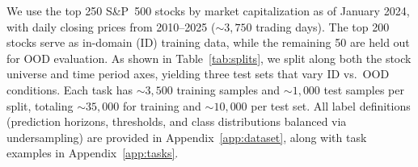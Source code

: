 We use the top 250 S\&P~500 stocks by market capitalization as of January 2024, with daily closing prices from 2010--2025 (${\sim}3{,}750$ trading days).
The top 200 stocks serve as in-domain (ID) training data, while the remaining 50 are held out for OOD evaluation.
As shown in Table~\ref{tab:splits}, we split along both the stock universe and time period axes, yielding three test sets that 
vary ID vs.\ OOD conditions.
Each task has ${\sim}3{,}500$ training samples
and ${\sim}1{,}000$ test samples per split, totaling ${\sim}35{,}000$ for training and ${\sim}10{,}000$ per test set.
All label definitions (prediction horizons, thresholds, and class distributions balanced via undersampling) are provided in Appendix~\ref{app:dataset}, along with task examples in Appendix~\ref{app:tasks}.


